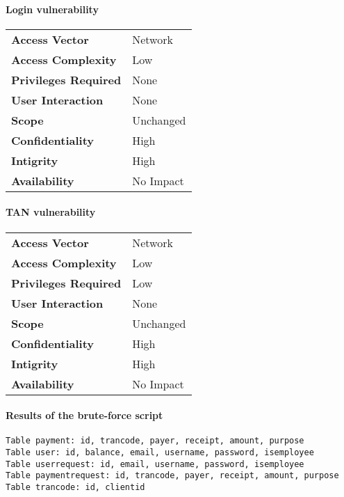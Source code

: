 \paragraph{Login vulnerability}

\begin{tabular}{l|p{10cm}}
\textbf{Access Vector} & Network \\
\textbf{Access Complexity} & Low \\
\textbf{Privileges Required} & None \\
\textbf{User Interaction} & None \\
\textbf{Scope} & Unchanged \\
\textbf{Confidentiality} & High \\
\textbf{Intigrity} & High \\
\textbf{Availability} & No Impact \\
\end{tabular}

\paragraph{TAN vulnerability}

\begin{tabular}{l|p{10cm}}
\textbf{Access Vector} & Network \\
\textbf{Access Complexity} & Low \\
\textbf{Privileges Required} & Low \\
\textbf{User Interaction} & None \\
\textbf{Scope} & Unchanged \\
\textbf{Confidentiality} & High \\
\textbf{Intigrity} & High \\
\textbf{Availability} & No Impact \\
\end{tabular}

\paragraph{Results of the brute-force script}

\begin{verbatim}
Table payment: id, trancode, payer, receipt, amount, purpose
Table user: id, balance, email, username, password, isemployee
Table userrequest: id, email, username, password, isemployee
Table paymentrequest: id, trancode, payer, receipt, amount, purpose
Table trancode: id, clientid
\end{verbatim}

